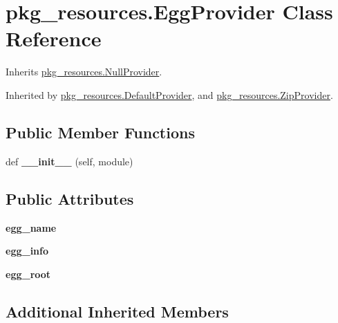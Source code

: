 \hypertarget{classpkg__resources_1_1_egg_provider}{}\section{pkg\+\_\+resources.\+Egg\+Provider Class Reference}
\label{classpkg__resources_1_1_egg_provider}


Inherits \hyperlink{classpkg__resources_1_1_null_provider}{pkg\+\_\+resources.\+Null\+Provider}.



Inherited by \hyperlink{classpkg__resources_1_1_default_provider}{pkg\+\_\+resources.\+Default\+Provider}, and \hyperlink{classpkg__resources_1_1_zip_provider}{pkg\+\_\+resources.\+Zip\+Provider}.

\subsection*{Public Member Functions}
\begin{DoxyCompactItemize}
\item 
\mbox{\label{classpkg__resources_1_1_egg_provider_a14a5f9785343ac3b25f469ddb6358e65}} 
def {\bfseries \+\_\+\+\_\+init\+\_\+\+\_\+} (self, module)
\end{DoxyCompactItemize}
\subsection*{Public Attributes}
\begin{DoxyCompactItemize}
\item 
\mbox{\label{classpkg__resources_1_1_egg_provider_a3ad4e46d4d17d838fa87cd90c9ae5356}} 
{\bfseries egg\+\_\+name}
\item 
\mbox{\label{classpkg__resources_1_1_egg_provider_aaf8024857e8194457b41b0a70b76fe02}} 
{\bfseries egg\+\_\+info}
\item 
\mbox{\label{classpkg__resources_1_1_egg_provider_a4f493d581c0d65f2d2960d9594138f24}} 
{\bfseries egg\+\_\+root}
\end{DoxyCompactItemize}
\subsection*{Additional Inherited Members}


